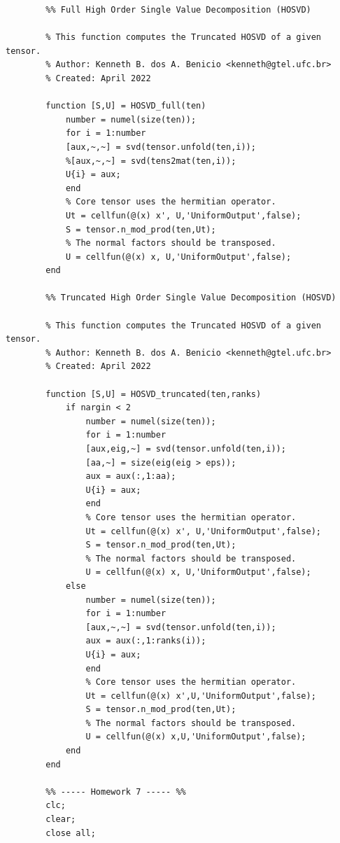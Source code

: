 \documentclass[a4paper,10pt]{article}
\begin{document}
    \begin{verbatim}
        %% Full High Order Single Value Decomposition (HOSVD)

        % This function computes the Truncated HOSVD of a given tensor.   
        % Author: Kenneth B. dos A. Benicio <kenneth@gtel.ufc.br>
        % Created: April 2022

        function [S,U] = HOSVD_full(ten)
            number = numel(size(ten));
            for i = 1:number
            [aux,~,~] = svd(tensor.unfold(ten,i)); 
            %[aux,~,~] = svd(tens2mat(ten,i)); 
            U{i} = aux;
            end
            % Core tensor uses the hermitian operator.
            Ut = cellfun(@(x) x', U,'UniformOutput',false); 
            S = tensor.n_mod_prod(ten,Ut);
            % The normal factors should be transposed.
            U = cellfun(@(x) x, U,'UniformOutput',false);  
        end

        %% Truncated High Order Single Value Decomposition (HOSVD)

        % This function computes the Truncated HOSVD of a given tensor.   
        % Author: Kenneth B. dos A. Benicio <kenneth@gtel.ufc.br>
        % Created: April 2022

        function [S,U] = HOSVD_truncated(ten,ranks)
            if nargin < 2
                number = numel(size(ten));
                for i = 1:number
                [aux,eig,~] = svd(tensor.unfold(ten,i)); 
                [aa,~] = size(eig(eig > eps));
                aux = aux(:,1:aa);
                U{i} = aux;
                end
                % Core tensor uses the hermitian operator.
                Ut = cellfun(@(x) x', U,'UniformOutput',false); 
                S = tensor.n_mod_prod(ten,Ut);
                % The normal factors should be transposed.
                U = cellfun(@(x) x, U,'UniformOutput',false);
            else
                number = numel(size(ten));
                for i = 1:number
                [aux,~,~] = svd(tensor.unfold(ten,i)); 
                aux = aux(:,1:ranks(i));
                U{i} = aux;
                end
                % Core tensor uses the hermitian operator.
                Ut = cellfun(@(x) x',U,'UniformOutput',false); 
                S = tensor.n_mod_prod(ten,Ut);
                % The normal factors should be transposed.
                U = cellfun(@(x) x,U,'UniformOutput',false);
            end    
        end

        %% ----- Homework 7 ----- %%
        clc;
        clear;
        close all;


\end{verbatim}
\end{document}
